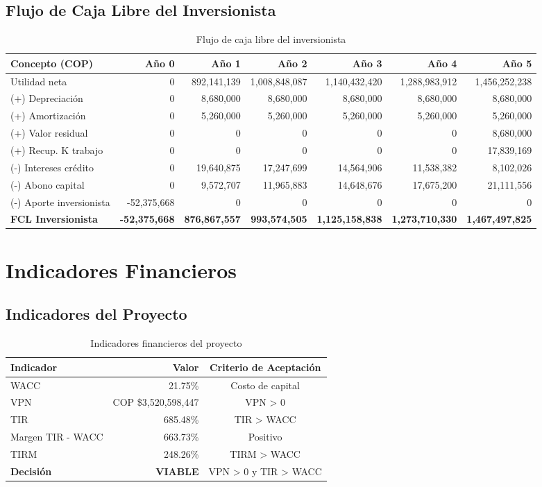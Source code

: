 \subsection{Flujo de Caja Libre del Inversionista}

\begin{table}[H]
\centering
\small
\begin{tabular}{lrrrrrr}
\toprule
\textbf{Concepto (COP)} & \textbf{Año 0} & \textbf{Año 1} & \textbf{Año 2} & \textbf{Año 3} & \textbf{Año 4} & \textbf{Año 5} \\
\midrule
Utilidad neta & 0 & 892,141,139 & 1,008,848,087 & 1,140,432,420 & 1,288,983,912 & 1,456,252,238 \\
(+) Depreciación & 0 & 8,680,000 & 8,680,000 & 8,680,000 & 8,680,000 & 8,680,000 \\
(+) Amortización & 0 & 5,260,000 & 5,260,000 & 5,260,000 & 5,260,000 & 5,260,000 \\
(+) Valor residual & 0 & 0 & 0 & 0 & 0 & 8,680,000 \\
(+) Recup. K trabajo & 0 & 0 & 0 & 0 & 0 & 17,839,169 \\
(-) Intereses crédito & 0 & 19,640,875 & 17,247,699 & 14,564,906 & 11,538,382 & 8,102,026 \\
(-) Abono capital & 0 & 9,572,707 & 11,965,883 & 14,648,676 & 17,675,200 & 21,111,556 \\
(-) Aporte inversionista & -52,375,668 & 0 & 0 & 0 & 0 & 0 \\
\midrule
\textbf{FCL Inversionista} & \textbf{-52,375,668} & \textbf{876,867,557} & \textbf{993,574,505} & \textbf{1,125,158,838} & \textbf{1,273,710,330} & \textbf{1,467,497,825} \\
\bottomrule
\end{tabular}
\caption{Flujo de caja libre del inversionista}
\end{table}

\section{Indicadores Financieros}

\subsection{Indicadores del Proyecto}

\begin{table}[H]
\centering
\begin{tabular}{lrc}
\toprule
\textbf{Indicador} & \textbf{Valor} & \textbf{Criterio de Aceptación} \\
\midrule
WACC & 21.75\% & Costo de capital \\
VPN & COP \$3,520,598,447 & VPN > 0 \\
TIR & 685.48\% & TIR > WACC \\
Margen TIR - WACC & 663.73\% & Positivo \\
TIRM & 248.26\% & TIRM > WACC \\
\midrule
\textbf{Decisión} & \textbf{VIABLE} & VPN > 0 y TIR > WACC \\
\bottomrule
\end{tabular}
\caption{Indicadores financieros del proyecto}
\end{table}

